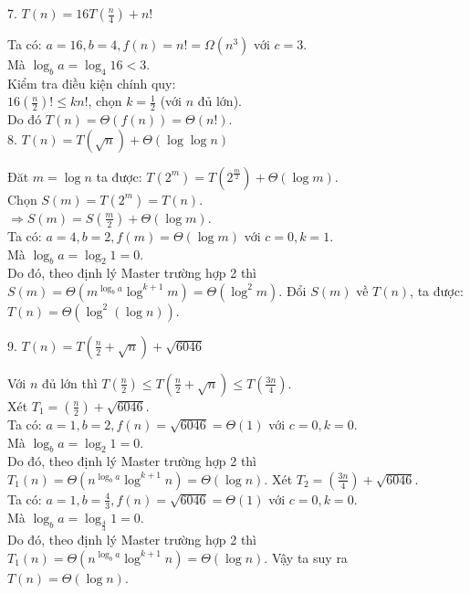 \documentclass[12pt, a4paper, fleqn]{article}
\begin{document}
		7. $\displaystyle
		T(n) = 16T\left( \frac{n}{4} \right) + n!$
		
		Ta có: $a = 16, b = 4, f(n) = n! = \Omega (n^3)$ với $c = 3$.\\
		Mà $\log_{b} a = \log_{4} 16 < 3$.\\
		Kiểm tra điều kiện chính quy:\\
		$\displaystyle
		16 \left( \frac{n}{2} \right)! \leq kn!$, chọn $\displaystyle
		k = \frac{1}{2}$ (với $n$ đủ lớn).\\
		Do đó $T(n) = \Theta (f(n)) = \Theta (n!)$.
		\\
		
		8. $T(n) = T\left( \sqrt{n} \right) + \Theta \left( \log{\log n} \right)$
		
		Đăt $m = \log n$ ta được: $\displaystyle
		T(2 ^ m) = T\left(2 ^ {\frac{m}{2}}\right) + \Theta \left( \log m \right)$.\\
		Chọn $S(m) = T(2 ^ m) = T(n)$.\\
		$\displaystyle
		\Rightarrow S(m) = S \left( \frac{m}{2} \right) + \Theta \left( \log m \right)$.\\
		Ta có: $a = 4, b = 2, f(m) = \Theta \left( \log m \right)$ với $c = 0, k = 1$.\\
		Mà $\log_{b} a = \log_{2} 1 = 0$.\\
		Do đó, theo định lý Master trường hợp 2 thì $S(m) = \Theta \left( m^{\log_{b} a} \log^{k + 1} m \right) = \Theta (\log^{2} m)$.
		Đổi $S(m)$ về $T(n)$, ta được: $T(n) = \Theta (\log^{2} \left( {\log n} \right))$.
		\clearpage
		
		9. $\displaystyle
		T(n) = T\left( \frac{n}{2} + \sqrt{n} \right) + \sqrt{6046}$
		
		Với $n$ đủ lớn thì $\displaystyle
		T\left( \frac{n}{2} \right) \leq T\left( \frac{n}{2} + \sqrt{n} \right) \leq T\left( \frac{3n}{4} \right)$.\\
		Xét $\displaystyle
		T_1 = \left( \frac{n}{2} \right) + \sqrt{6046}$.\\
		Ta có: $a = 1, b = 2, f(n) = \sqrt{6046} = \Theta (1)$ với $c = 0, k = 0$.\\
		Mà $\log_{b} a = \log_{2} 1 = 0$.\\
		Do đó, theo định lý Master trường hợp 2 thì $T_1(n) = \Theta \left( n^{\log_{b} a} \log^{k + 1} n \right) = \Theta (\log n)$.
		Xét $\displaystyle
		T_2 = \left( \frac{3n}{4} \right) + \sqrt{6046}$.\\
		Ta có: $\displaystyle
		a = 1, b = \frac{4}{3}, f(n) = \sqrt{6046} = \Theta (1)$ với $c = 0, k = 0$.\\
		Mà $\displaystyle
		\log_{b} a = \log_{\frac{4}{3}} 1 = 0$.\\
		Do đó, theo định lý Master trường hợp 2 thì $T_1(n) = \Theta \left( n^{\log_{b} a} \log^{k + 1} n \right) = \Theta (\log n)$.
		Vậy ta suy ra $T(n) = \Theta (\log n)$.
		\\
		
\end{document}
